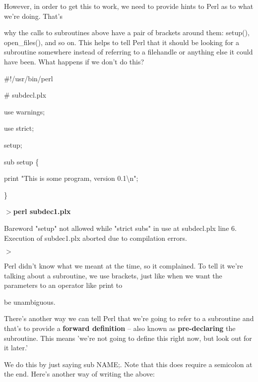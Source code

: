 \documentclass[a4paper,11pt]{book}
\begin{document}
\noindent 

\noindent 

\noindent However, in order to get this to work, we need to provide hints to Perl as to what we're doing. That's

\noindent why the calls to subroutines above have a pair of brackets around them: setup(), open\_files(), and so on. This helps to tell Perl that it should be looking for a subroutine somewhere instead of referring to a filehandle or anything else it could have been. What happens if we don't do this?

\noindent 

\noindent \#!/usr/bin/perl

\noindent \# subdecl.plx

\noindent use warnings;

\noindent use strict;

\noindent 

\noindent setup;

\noindent sub setup \{

\noindent print "This is some program, version 0.1\textbackslash n";

\noindent \}

\noindent 

\noindent $>$\textbf{perl subdec1.plx}

\noindent Bareword "setup" not allowed while "strict subs" in use at subdecl.plx line 6. Execution of subdec1.plx aborted due to compilation errors.

\noindent $>$

\noindent 

\noindent Perl didn't know  what we meant  at  the  time,  so  it  complained.  To  tell  it  we're  talking  about a subroutine,  we use  brackets,  just  like  when  we want  the  parameters  to  an  operator  like print to

\noindent be unambiguous.

\noindent 

\noindent There's another way we can tell Perl that we're going to refer to a subroutine and that's to provide a \textbf{forward definition }-- also known as \textbf{pre-declaring }the subroutine. This means 'we're not going to define this right now, but look out for it later.'

\noindent 

\noindent We do this by just saying sub NAME;. Note that this does require a semicolon at the end. Here's another way of writing the above:
\end{document}
